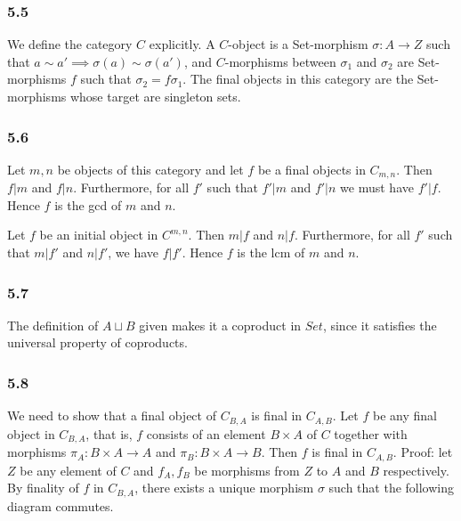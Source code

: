 \documentclass{article}
\begin{document}
\subsubsection*{5.5}

We define the category $C$ explicitly. A $C$-object is a Set-morphism $\sigma: A \to Z$ such that $a \sim a' \implies \sigma(a) \sim \sigma(a')$, and $C$-morphisms between $\sigma_1$ and $\sigma_2$ are Set-morphisms $f$ such that $\sigma_2 = f \sigma_1$. The final objects in this category are the Set-morphisms whose target are singleton sets.

\subsubsection*{5.6}

Let $m, n$ be objects of this category and let $f$ be a final objects in $C_{m, n}$. Then $f | m$ and $f | n$. Furthermore, for all $f'$ such that $f' | m$ and $f' | n$ we must have $f' | f$. Hence $f$ is the gcd of $m$ and $n$.

Let $f$ be an initial object in $C^{m, n}$. Then $m | f$ and $n | f$. Furthermore, for all $f'$ such that $m | f'$ and $n | f'$, we have $f | f'$. Hence $f$ is the lcm of $m$ and $n$.

\subsubsection*{5.7}

The definition of $A \sqcup B$ given makes it a coproduct in $Set$, since it satisfies the universal property of coproducts.

\subsubsection*{5.8}

We need to show that a final object of $C_{B, A}$ is final in $C_{A, B}$. Let $f$ be any final object in $C_{B, A}$, that is, $f$ consists of an element $B \times A$ of $C$ together with morphisms $\pi_A: B \times A \to A$ and $\pi_B: B \times A \to B$. Then $f$ is final in $C_{A, B}$. Proof: let $Z$ be any element of $C$ and $f_A, f_B$ be morphisms from $Z$ to $A$ and $B$ respectively. By finality of $f$ in $C_{B, A}$, there exists a unique morphism $\sigma$ such that the following diagram commutes.

\end{document}
